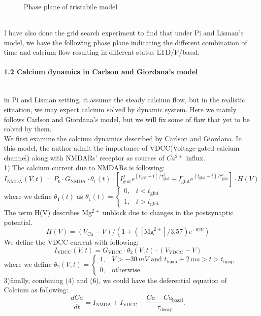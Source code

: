 \documentclass{article}
\begin{document}
\begin{figure}[h]
\begin{minipage}[b]{0.45\textwidth}
        \caption{Phase plane of tristabile model}
        \label{fig:image2}
    \end{minipage}
\end{figure}\\
I have also done the grid search experiment to find that under Pi and Lisman's model, we have the following phase plane indicating the different combination of time and calcium flow resulting in different status LTD/P/basal.

\paragraph{1.2 Calcium dynamics in Carlson and Giordana's model}\mbox{}\\  
in Pi and Lisman setting, it assume the steady calcium flow, but in the realistic situation, we may expect calcium solved by dynamic system. Here we mainly follows Carlson and Giordana's model, but we will fix some of flaw that yet to be solved by them.\\
\linebreak
We first examine the calcium dynamics described by Carlson and Giordana. In this model, the author admit the importance of VDCC(Voltage-gated calcium channel) along with NMDARs' receptor as sources of \(Ca^{2+}\) influx.\\
1) The calcium current due to NMDARs is following:
\begin{equation}
I_{\text{NMDA}}(V, t) = P_0 \cdot G_{\text{NMDA}} \cdot \theta_1(t) \cdot \left[ I^f_{\text{glut}} e^{(t_{\text{glut}} - t)/\tau^f_{\text{glut}}} + I^s_{\text{glut}} e^{(t_{\text{glut}} - t)/\tau^s_{\text{glut}}} \right] \cdot H(V)
\end{equation}
where  we define $\theta_1(t)$ as \(\theta_1(t) = 
\begin{cases} 
0, & t < t_{\text{glut}} \\
1, & t > t_{\text{glut}}
\end{cases}\)\\
The term H(V) describes Mg$^{2+}$ unblock due to changes in the postsynaptic potential.
\begin{equation}
H(V) = (V_{\text{Ca}} - V) / \left(1 + ([\text{Mg}^{2+}] / 3.57) e^{-62V}\right)
\end{equation}
 We define the VDCC current with following:
\begin{equation}
    I_{\text{VDCC}}(V, t) = G_{\text{VDCC}} \cdot \theta_2(V, t) \cdot (V_{\text{VDCC}} - V)
\end{equation}
where  we define \(\theta_2(V, t) =
\begin{cases}
1, & V > -30\,mV \text{ and } t_{\text{bpap}} + 2\,ms > t > t_{\text{bpap}} \\
0, & \text{otherwise}
\end{cases}\)\\
3)finally, combining (4) and (6), we could have the deferential equation of Calcium as following:
\begin{equation}
    \frac{dCa}{dt} = I_{\text{NMDA}} + I_{\text{VDCC}} - \frac{Ca - Ca_{\text{basal}}}{\tau_{\text{decay}}}.
\end{equation}
\end{document}
